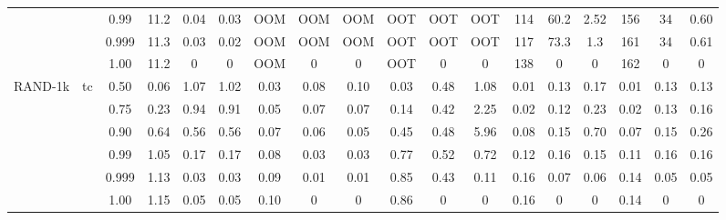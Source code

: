 \documentclass[sigconf,screen,review,natbib]{acmart}
\theoremstyle{definition}
\begin{document}
\begin{table}[!ht]
\begin{center}
\begin{tabular}{|c|c|c|c|c|c|c|c|c|c|c|c|c|c|c|c|c|c|}
			        &                         & 0.99  & 11.2                      & 0.04                          & 0.03                       & OOM                            & OOM                      & OOM  & OOT  & OOT  & OOT  & 114  & 60.2 & 2.52 & 156  & 34   & 0.60 \\
			        &                         & 0.999 & 11.3                      & 0.03                          & 0.02                       & OOM                            & OOM                      & OOM  & OOT  & OOT  & OOT  & 117  & 73.3 & 1.3  & 161  & 34   & 0.61 \\
			        &                         & 1.00  & 11.2                      & 0                             & 0                          & OOM                            & 0                        & 0    & OOT  & 0    & 0    & 138  & 0    & 0    & 162  & 0    & 0    \\
			\hline
			RAND-1k & \multirow{6}{*}{tc}     & 0.50  & 0.06                      & 1.07                          & 1.02                       & 0.03                           & 0.08                     & 0.10 & 0.03 & 0.48 & 1.08 & 0.01 & 0.13 & 0.17 & 0.01 & 0.13 & 0.13 \\
			        &                         & 0.75  & 0.23                      & 0.94                          & 0.91                       & 0.05                           & 0.07                     & 0.07 & 0.14 & 0.42 & 2.25 & 0.02 & 0.12 & 0.23 & 0.02 & 0.13 & 0.16 \\
			        &                         & 0.90  & 0.64                      & 0.56                          & 0.56                       & 0.07                           & 0.06                     & 0.05 & 0.45 & 0.48 & 5.96 & 0.08 & 0.15 & 0.70 & 0.07 & 0.15 & 0.26 \\
			        &                         & 0.99  & 1.05                      & 0.17                          & 0.17                       & 0.08                           & 0.03                     & 0.03 & 0.77 & 0.52 & 0.72 & 0.12 & 0.16 & 0.15 & 0.11 & 0.16 & 0.16 \\
			        &                         & 0.999 & 1.13                      & 0.03                          & 0.03                       & 0.09                           & 0.01                     & 0.01 & 0.85 & 0.43 & 0.11 & 0.16 & 0.07 & 0.06 & 0.14 & 0.05 & 0.05 \\
			        &                         & 1.00  & 1.15                      & 0.05                          & 0.05                       & 0.10                           & 0                        & 0    & 0.86 & 0    & 0    & 0.16 & 0    & 0    & 0.14 & 0    & 0    \\

\end{tabular}
\end{center}
\end{table}
\end{document}
